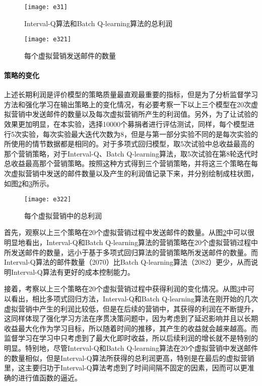 \begin{figure}[htbp]
\centering
\texttt{[image: e31]}
\caption{Interval-Q算法和Batch Q-learning算法的总利润}
\label{fig:e31}
\end{figure}

\begin{figure}[htbp]
\centering
\texttt{[image: e321]}
\caption{每个虚拟营销发送邮件的数量}
\label{fig:e321}
\end{figure}

\paragraph{策略的变化}
上述长期利润是评价模型的策略质量最直观最重要的指标，但是为了分析监督学习方法和强化学习在输出策略上的变化情况，有必要考察一下以上三个模型在20次虚拟营销中发送邮件的数量以及每次虚拟营销所产生的利润值。另外，为了让试验的效果更加明显，在本实验，选择10000个募捐者进行评估测试，同样，每个模型进行5次实验，每次实验最大迭代次数为8，但是与第一部分实验不同的是每次实验的所使用的情节数据都是相同的。对于多项式回归模型，取5次试验中总收益最高的那个营销策略，对于Interval-Q、Batch Q-learning算法，取5次试验在第8轮迭代时总收益最高那个营销策略。按照这种方式得到三个营销策略，并将这三个策略在每次虚拟营销中发送的邮件数量以及产生的利润值记录下来，并分别绘制成柱状图，如图\ref{fig:e321}和\ref{fig:e322}所示。

\begin{figure}[htbp]
\centering
\texttt{[image: e322]}
\caption{每个虚拟营销中的总利润}
\label{fig:e322}
\end{figure}

首先，观察以上三个策略在20个虚拟营销过程中发送邮件的数量。从图\ref{fig:e321}中可以很明显地看出，Interval-Q和Batch Q-learning算法的营销策略在20个虚拟营销过程中所发送邮件的数量，远小于基于多项式回归算法的营销策略所发送邮件的数量。而Interval-Q算法的邮件数量（2070）比Batch Q-learning算法（2082）更少，从而说明Interval-Q算法有更好的成本控制能力。



接着，考察以上三个策略在20个虚拟营销过程中获得利润的变化情况。从图\ref{fig:e322}中可以看出，相比多项式回归方法，Interval-Q和Batch Q-learning算法在刚开始的几次虚拟营销中产生的利润比较低，但是在后续的营销中，其获得的利润在不断提升，这同样体现了强化学习方法在序贯决策问题中，因为考虑到了延迟影响并且以长期收益最大化作为学习目标，所以随着时间的推移，其产生的收益就会越来越高。而监督学习在学习中只考虑到了最大化即时收益，所以后续利润的增长就不是特别的明显。特别地，尽管Interval-Q和Batch Q-learning算法在20个虚拟营销中发送邮件的数量相似，但是Interval-Q算法所获得的总利润更高，特别是在最后的虚拟营销里，这主要归功于Interval-Q算法考虑到了时间间隔不固定的因素，因而可以更准确的进行值函数的逼近。

